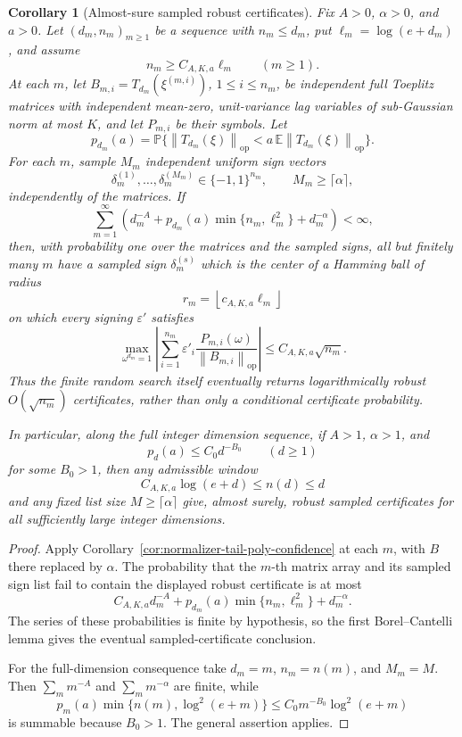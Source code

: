 \documentclass[11pt]{amsart}
\numberwithin{equation}{section}
\newtheorem{corollary}[theorem]{Corollary}
\theoremstyle{definition}
\theoremstyle{remark}
\newcommand{\op}{\mathrm{op}}
\newcommand{\Prob}{\mathbb P}
\newcommand{\Exp}{\mathbb E}
\newcommand{\norm}[1]{\left\lVert #1\right\rVert}
\newcommand{\eps}{\varepsilon}
\begin{document}
\begin{corollary}[Almost-sure sampled robust certificates]
\label{cor:normalizer-tail-borel-poly-confidence}
Fix \(A>0\), \(\alpha>0\), and \(a>0\).  Let
\((d_m,n_m)_{m\ge1}\) be a sequence with \(n_m\le d_m\), put
\(\ell_m=\log(e+d_m)\), and assume
\[
  n_m\ge C_{A,K,a}\ell_m
  \qquad(m\ge1).
\]
At each \(m\), let \(B_{m,i}=T_{d_m}(\xi^{(m,i)})\), \(1\le i\le n_m\), be
independent full Toeplitz matrices with independent mean-zero, unit-variance
lag variables of sub-Gaussian norm at most \(K\), and let \(P_{m,i}\) be their
symbols.  Let
\[
  p_{d_m}(a)
  =\Prob\{\norm{T_{d_m}(\xi)}_{\op}
  <a\,\Exp\norm{T_{d_m}(\xi)}_{\op}\}.
\]
For each \(m\), sample \(M_m\) independent uniform sign vectors
\[
  \delta_m^{(1)},\ldots,\delta_m^{(M_m)}\in\{-1,1\}^{n_m},
  \qquad M_m\ge\lceil\alpha\rceil ,
\]
independently of the matrices.  If
\[
  \sum_{m=1}^\infty
  \left(d_m^{-A}
  +p_{d_m}(a)\min\{n_m,\ell_m^2\}
  +d_m^{-\alpha}\right)<\infty ,
\]
then, with probability one over the matrices and the sampled signs, all but
finitely many \(m\) have a sampled sign \(\delta_m^{(s)}\) which is the center
of a Hamming ball of radius
\[
  r_m=\left\lfloor c_{A,K,a}\ell_m\right\rfloor
\]
on which every signing \(\eps'\) satisfies
\[
  \max_{\omega^{d_m}=1}\left|\sum_{i=1}^{n_m}
  \eps'_i\frac{P_{m,i}(\omega)}{\norm{B_{m,i}}_{\op}}\right|
  \le C_{A,K,a}\sqrt{n_m}.
\]
Thus the finite random search itself eventually returns logarithmically robust
\(O(\sqrt{n_m})\) certificates, rather than only a conditional certificate
probability.

In particular, along the full integer dimension sequence, if \(A>1\),
\(\alpha>1\), and
\[
  p_d(a)\le C_0d^{-B_0}\qquad(d\ge1)
\]
for some \(B_0>1\), then any admissible window
\[
  C_{A,K,a}\log(e+d)\le n(d)\le d
\]
and any fixed list size \(M\ge\lceil\alpha\rceil\) give, almost surely, robust
sampled certificates for all sufficiently large integer dimensions.
\end{corollary}

\begin{proof}
Apply Corollary~\ref{cor:normalizer-tail-poly-confidence} at each \(m\), with
\(B\) there replaced by \(\alpha\).  The probability that the \(m\)-th matrix
array and its sampled sign list fail to contain the displayed robust certificate
is at most
\[
  C_{A,K,a}d_m^{-A}
  +p_{d_m}(a)\min\{n_m,\ell_m^2\}
  +d_m^{-\alpha}.
\]
The series of these probabilities is finite by hypothesis, so the first
Borel--Cantelli lemma gives the eventual sampled-certificate conclusion.

For the full-dimension consequence take \(d_m=m\), \(n_m=n(m)\), and
\(M_m=M\).  Then \(\sum_m m^{-A}\) and \(\sum_m m^{-\alpha}\) are finite, while
\[
  p_m(a)\min\{n(m),\log^2(e+m)\}
  \le C_0m^{-B_0}\log^2(e+m)
\]
is summable because \(B_0>1\).  The general assertion applies.
\end{proof}
\end{document}
